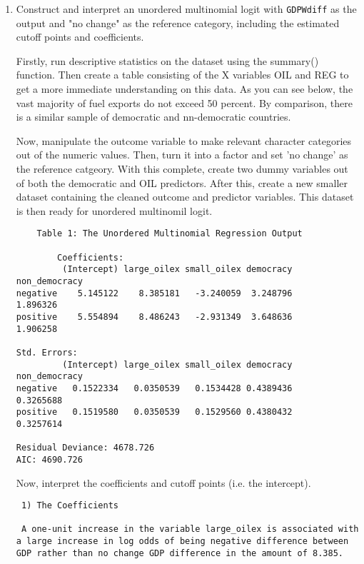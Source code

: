 \documentclass[12pt,letterpaper]{article}
\begin{document}
\begin{enumerate}
	\item Construct and interpret an unordered multinomial logit with \texttt{GDPWdiff} as the output and "no change" as the reference category, including the estimated cutoff points and coefficients.

Firstly, run descriptive statistics on the dataset using the summary() function. Then create a table consisting of the X variables OIL and REG to get a more immediate understanding on this data. As you can see below, the vast majority of fuel exports do not exceed 50 percent. By comparison, there is a similar sample of democratic and nn-democratic countries. 
	
		 
	
Now, manipulate the outcome variable to make relevant character categories out of the numeric values. Then, turn it into a factor and set 'no  change' as the reference catgeory. With this complete, create two dummy variables out of both the democratic and OIL predictors. After this, create a new smaller dataset containing the cleaned outcome and predictor variables. This dataset is then ready for unordered multinomil logit.  
 
 	 
 	
 		\begin{verbatim}
 	Table 1: The Unordered Multinomial Regression Output 
 	
 		Coefficients:
         (Intercept) large_oilex small_oilex democracy non_democracy
negative    5.145122    8.385181   -3.240059  3.248796      1.896326
positive    5.554894    8.486243   -2.931349  3.648636      1.906258

Std. Errors:
         (Intercept) large_oilex small_oilex democracy non_democracy
negative   0.1522334   0.0350539   0.1534428 0.4389436     0.3265688
positive   0.1519580   0.0350539   0.1529560 0.4380432     0.3257614

Residual Deviance: 4678.726 
AIC: 4690.726 
 	\end{verbatim}
 
 Now, interpret the coefficients and cutoff points (i.e. the intercept). 
 
 	\begin{verbatim}
 1) The Coefficients
 
 A one-unit increase in the variable large_oilex is associated with a large increase in log odds of being negative difference between GDP rather than no change GDP difference in the amount of 8.385.


\end{verbatim}
\end{enumerate}
\end{document}
